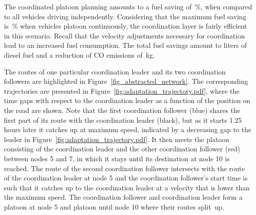 \documentclass[journal]{IEEEtran}
\begin{document}
The coordinated platoon planning amounts to a fuel saving of \,\%, when compared to all vehicles driving independently. Considering that the maximum fuel saving is \,\% when vehicles platoon continuously, the coordination layer is fairly efficient in this scenario. Recall that the velocity adjustments necessary for coordination lead to an increased fuel consumption. The total fuel savings amount to  liters of diesel fuel and a reduction of CO emissions of \,kg.

The routes of one particular coordination leader and its two coordination followers are highlighted in Figure~\ref{fig_abstracted_network}. The corresponding trajectories are presented in Figure~\ref{fig:adaptation_trajectory.pdf}, where the time gaps with respect to the coordination leader as a function of the position on the road are shown. Note that the first coordination follower (blue) shares the first part of its route with the coordination leader (black), but as it starts 1.25 hours later it catches up at maximum speed, indicated by a decreasing gap to the leader in Figure~\ref{fig:adaptation_trajectory.pdf}. It then meets the platoon consisting of the coordination leader and the other coordination follower (red) between nodes 5 and 7, in which it stays until its destination at node 10 is reached. The route of the second coordination follower intersects with the route of the coordination leader at node 5 and the coordination follower's start time is such that it catches up to the coordination leader at a velocity that is lower than the maximum speed. The coordination follower and coordination leader form a platoon at node 5 and platoon until node 10 where their routes split~up.
\end{document}
